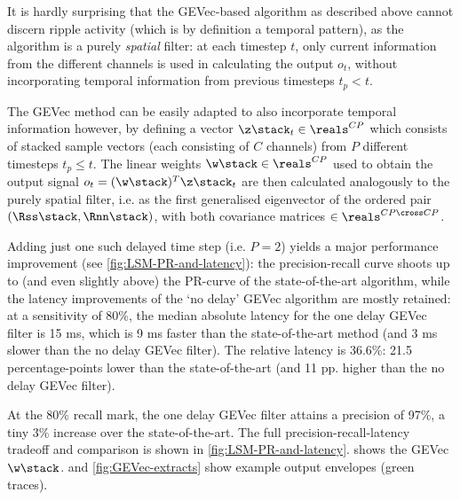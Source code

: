 \label{sec:spatiotemporal}

It is hardly surprising that the GEVec-based algorithm as described above cannot discern ripple activity (which is by definition a temporal pattern), as the algorithm is a purely \emph{spatial} filter: at each timestep $t$, only current information from the different channels is used in calculating the output $o_t$, without incorporating temporal information from previous timesteps $t_p < t$.

The GEVec method can be easily adapted to also incorporate temporal information however, by defining a vector $\z\stack_t \in \reals^{CP}$ which consists of stacked sample vectors (each consisting of $C$ channels) from $P$ different timesteps $t_p \leq t$. The linear weights $\w\stack \in \reals^{CP}$ used to obtain the output signal $o_t = (\w\stack)^T \z\stack_t$ are then calculated analogously to the purely spatial filter, i.e. as the first generalised eigenvector of the ordered pair $(\Rss\stack, \Rnn\stack)$, with both covariance matrices $\in \reals^{CP \cross CP}$.

Adding just one such delayed time step (i.e. $P = 2$) yields a major performance improvement (see \cref{fig:LSM-PR-and-latency}): the precision-recall curve shoots up to (and even slightly above) the PR-curve of the state-of-the-art algorithm, while the latency improvements of the `no delay' GEVec algorithm are mostly retained: at a sensitivity of 80\%, the median absolute latency for the one delay GEVec filter is 15 ms, which is 9 ms faster than the state-of-the-art method (and 3 ms slower than the no delay GEVec filter). The relative latency is 36.6\%: 21.5 percentage-points lower than the state-of-the-art (and 11 pp. higher than the no delay GEVec filter).

At the 80\% recall mark, the one delay GEVec filter attains a precision of 97\%, a tiny 3\% increase over the state-of-the-art. The full precision-recall-latency tradeoff and comparison is shown in \cref{fig:LSM-PR-and-latency}.  shows the GEVec $\w\stack$.  and \cref{fig:GEVec-extracts} show example output envelopes (green traces).
